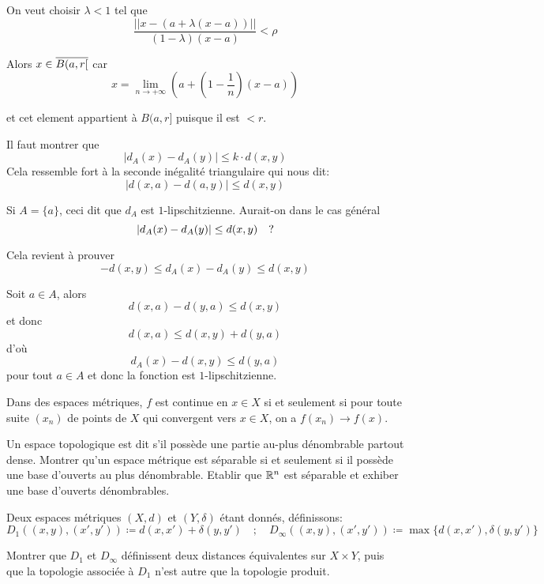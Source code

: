\documentclass[french,a4paper,10pt]{article}
\begin{document}
\begin{td-sol}
\begin{enumerate}
            On veut choisir $\lambda<1$ tel que 
                \[
                    \frac{||x-(a+\lambda(x-a))||}{(1-\lambda)(x-a)}<\rho
                \]

            Alors $x\in \overline{B(a,r[}$ car
            \[
                x=\lim_{n\to+\infty}\left(a+\left(1-\frac1n\right)(x-a)\right)
            \]

            et cet element appartient à $B(a,r]$ puisque il est $<r$.
        \end{enumerate}
    \end{td-sol}

    \begin{td-sol}[4]
        Il faut montrer que 
        \[
            |d_A(x)-d_A(y)|\le k\cdot d(x,y)
        \]
        Cela ressemble fort à la seconde inégalité triangulaire qui nous dit:
        \[
            |d(x,a)-d(a,y)|\le d(x,y)
        \]

        Si $A=\{a\}$, ceci dit que $d_A$ est $1$-lipschitzienne. 
        Aurait-on dans le cas général
        \[
            |d_A(x)-d_A(y)|\le d(x,y)\quad\text ?
        \]

        Cela revient à prouver
        \[
            -d(x,y)\le d_A(x)-d_A(y)\le d(x,y)
        \]

        Soit $a\in A$, alors
        \[
            d(x,a)-d(y,a)\le d(x,y)
        \]
        et donc
        \[
            d(x,a)\le d(x,y)+d(y,a)
        \]
        d'où
        \[
            d_A(x)-d(x,y)\le d(y,a)
        \]
        pour tout $a\in A$ et donc la fonction est $1$-lipschitzienne.

        Dans des espaces métriques, $f$ est continue en $x\in X$ si et seulement si
        pour toute suite $(x_n)$ de points de $X$ qui convergent vers $x\in X$,
        on a $f(x_n)\to f(x)$.

    \end{td-sol}

    \begin{td-exo}[5]
        Un espace topologique est dit  s'il possède une partie au-plus dénombrable
        partout dense. Montrer qu'un espace métrique est séparable si et seulement si il possède
        une base d'ouverts au plus dénombrable. Etablir que $\mathbb{R}^n$ est séparable et exhiber une base
        d'ouverts dénombrables.
    \end{td-exo}


    \begin{td-exo}[6]
        Deux espaces métriques $(X,d)$ et $(Y,\delta)$ étant donnés, définissons:
        \[
            D_1((x,y),(x',y'))\coloneqq d(x,x')+\delta(y,y')\quad;\quad D_\infty((x,y),(x',y'))\coloneqq \max\{d(x,x'),\delta(y,y')\}
        \]

        Montrer que $D_1$ et $D_\infty$ définissent deux distances équivalentes sur $X\times Y$,
        puis que la topologie associée à $D_1$ n'est autre que la topologie produit.
    \end{td-exo}
\end{document}

